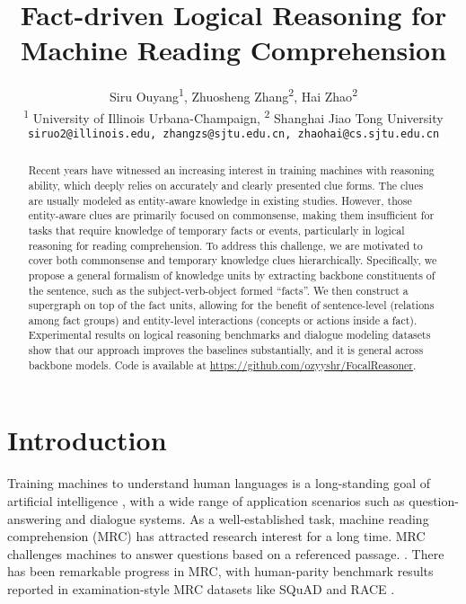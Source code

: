 \documentclass[11pt]{article}
\title{Fact-driven Logical Reasoning for Machine Reading Comprehension}
\author{Siru Ouyang\textsuperscript{1}, Zhuosheng Zhang\textsuperscript{2}, Hai Zhao\textsuperscript{2} \\
  \textsuperscript{1} University of Illinois Urbana-Champaign, \textsuperscript{2} Shanghai Jiao Tong University   \\
  \normalsize\texttt{siruo2@illinois.edu, zhangzs@sjtu.edu.cn, zhaohai@cs.sjtu.edu.cn}}
\begin{document}
\maketitle
\begin{abstract}
Recent years have witnessed an increasing interest in training machines with reasoning ability, which deeply relies on accurately and clearly presented clue forms. The clues are usually modeled as entity-aware knowledge in existing studies. However, those entity-aware clues are primarily focused on commonsense, making them insufficient for tasks that require knowledge of temporary facts or events, particularly in logical reasoning for reading comprehension. To address this challenge, we are motivated to cover both commonsense and temporary knowledge clues hierarchically. Specifically, we propose a general formalism of knowledge units by extracting backbone constituents of the sentence, such as the subject-verb-object formed ``facts''. We then construct a supergraph on top of the fact units, allowing for the benefit of sentence-level (relations among fact groups) and entity-level interactions (concepts or actions inside a fact). Experimental results on logical reasoning benchmarks and dialogue modeling datasets show that our approach improves the baselines substantially, and it is general across backbone models. Code is available at \url{https://github.com/ozyyshr/FocalReasoner}.
\end{abstract}


\section{Introduction}

Training machines to understand human languages is a long-standing goal of artificial intelligence \citep{hermann2015teaching}, with a wide range of application scenarios such as question-answering and dialogue systems. As a well-established task, machine reading comprehension (MRC) has attracted research interest for a long time. MRC challenges machines to answer questions based on a referenced passage. \citep{chen2016thorough,sachan2016machine,Seo2016Bidirectional,dhingra2017gated,Cui2017Attention,song2018exploring,hu2019read,zhang2019sg,back2020neurquri,zhang2020retrospective}. There has been remarkable progress in MRC, with human-parity benchmark results reported in examination-style MRC datasets like SQuAD \citep{rajpurkar-etal-2016-squad} and RACE \citep{lai2017race}. 
\end{document}
